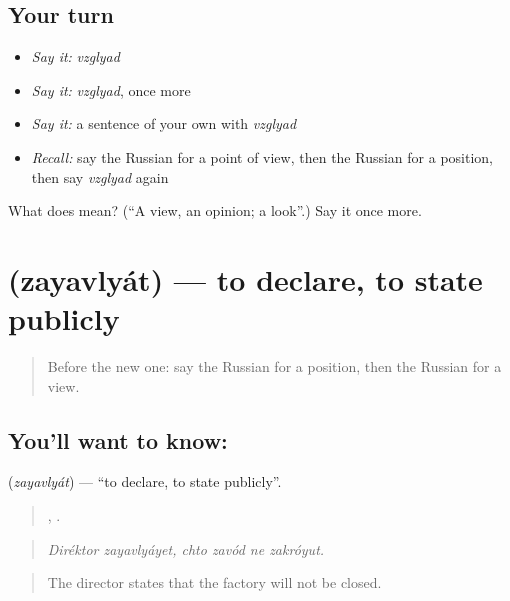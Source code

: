\subsection*{Your turn}
\begin{itemize}
\raggedright
  \item \emph{Say it:} \emph{vzglyad}
  \item \emph{Say it:} \emph{vzglyad}, once more
  \item \emph{Say it:} a sentence of your own with \emph{vzglyad}
  \item \emph{Recall:} say the Russian for a point of view, then the Russian for a position, then say \emph{vzglyad} again
\end{itemize}

\begin{tcolorbox}[breakable,colback=teal!4,colframe=teal!35!black,title={Before you move on}]
What does  mean? (\textquotedblleft{}A view, an opinion; a look\textquotedblright{}.) Say it once more.
\end{tcolorbox}
\section[\texorpdfstring{\ru{заявлять} (zayavlyát)}{заявлять (zayavlyát)}]{ (zayavlyát) — to declare, to state publicly}

\label{lesson:RU-C337-zayavlyat}



\begin{quote}
Before the new one: say the Russian for a position, then the Russian for a view.
\end{quote}

\subsection*{You'll want to know: }
\textbf{} (\emph{zayavlyát}) — \textquotedblleft{}to declare, to state publicly\textquotedblright{}.

\begin{quote}
 ,    .
\end{quote}

\begin{quote}
\emph{Diréktor zayavlyáyet, chto zavód ne zakróyut.}
\end{quote}

\begin{quote}
The director states that the factory will not be closed.
\end{quote}


